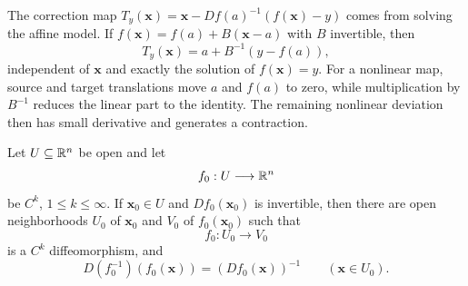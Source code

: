The correction map $T_y(\mathbf{x})=\mathbf{x}-Df(a)^{-1}(f(\mathbf{x})-y)$ comes from solving
the affine model. If $f(\mathbf{x})=f(a)+B(\mathbf{x}-a)$ with $B$ invertible, then
\[
T_y(\mathbf{x})=a+B^{-1}(y-f(a)),
\]
independent of $\mathbf{x}$ and exactly the solution of $f(\mathbf{x})=y$. For a nonlinear
map, source and target translations move $a$ and $f(a)$ to zero, while
multiplication by $B^{-1}$ reduces the linear part to the identity. The
remaining nonlinear deviation then has small derivative and generates a
contraction.

\begin{theorem}
\label{thm:multivariable-inverse-function}
Let $U\subseteq\mathbb{R}^n$ be open and let
\[
f_0:U\longrightarrow\mathbb{R}^n
\]
be $C^k$, $1\leq k\leq\infty$. If $\mathbf{x}_0\in U$ and $Df_0(\mathbf{x}_0)$ is
invertible, then there are open neighborhoods $U_0$ of $\mathbf{x}_0$ and $V_0$
of $f_0(\mathbf{x}_0)$ such that
\[
f_0:U_0\longrightarrow V_0
\]
is a $C^k$ diffeomorphism, and
\[
D(f_0^{-1})(f_0(\mathbf{x}))=(Df_0(\mathbf{x}))^{-1}
\qquad(\mathbf{x}\in U_0).
\]
\end{theorem}
